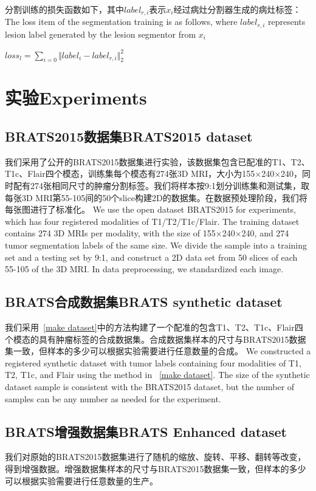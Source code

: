 \documentclass[letterpaper]{article} %
\begin{document}
分割训练的损失函数如下，其中$label_{r,i}$表示$x_i$经过病灶分割器生成的病灶标签：
The loss item of the segmentation training is as follows, where $label_{r,i}$ represents lesion label generated by the lesion segmentor from $x_i$
\begin{center}
		$loss_{l}=\sum\limits_{i=0}\Vert{label_i-label_{r,i}}\Vert_{2}^{2}$
\end{center}


\section{实验Experiments}

\subsection{BRATS2015数据集BRATS2015 dataset}
我们采用了公开的BRATS2015\cite{91menze:hal-00935640}数据集进行实验，该数据集包含已配准的T1、T2、T1c、Flair四个模态，训练集每个模态有274张3D MRI，大小为155$\times$240$\times$240，同时配有274张相同尺寸的肿瘤分割标签。我们将样本按9:1划分训练集和测试集，取每张3D MRI第55-105间的50个slice构建2D的数据集。在数据预处理阶段，我们将每张图进行了标准化。
We use the open dataset BRATS2015 for experiments, which has four registered modalities of T1/T2/T1c/Flair. The training dataset contains 274 3D MRIs per modality, with the size of 155$\times$240$\times$240, and 274 tumor segmentation labels of the same size. We divide the sample into a training set and a testing set by 9:1, and construct a 2D data set from 50 slices of each 55-105 of the 3D MRI. In data preprocessing, we standardized each image.

\subsection{BRATS合成数据集BRATS synthetic dataset}
我们采用~\ref{make dataset}中的方法构建了一个配准的包含T1、T2、T1c、Flair四个模态的具有肿瘤标签的合成数据集。合成数据集样本的尺寸与BRATS2015数据集一致，但样本的多少可以根据实验需要进行任意数量的合成。
We constructed a registered synthetic dataset with tumor labels containing four modalities of T1, T2, T1c, and Flair using the method in ~\ref{make dataset}. The size of the synthetic dataset sample is consistent with the BRATS2015 dataset, but the number of samples can be any number as needed for the experiment.

\subsection{BRATS增强数据集BRATS Enhanced dataset}
我们对原始的BRATS2015数据集进行了随机的缩放、旋转、平移、翻转等改变，得到增强数据。增强数据集样本的尺寸与BRATS2015数据集一致，但样本的多少可以根据实验需要进行任意数量的生产。
\end{document}
